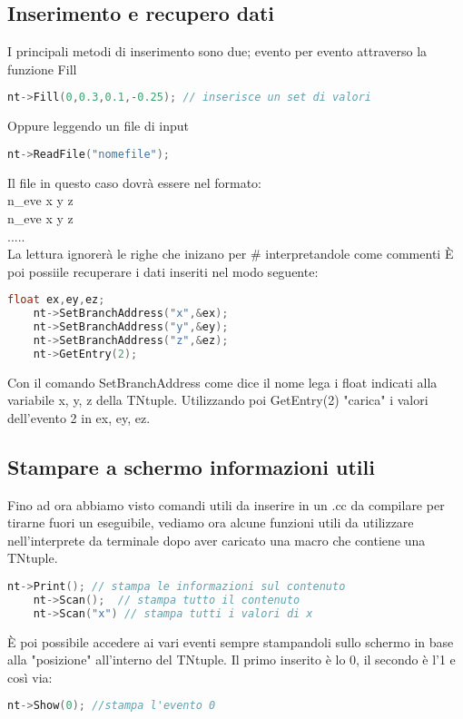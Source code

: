 \subsection{Inserimento e recupero dati}
I principali metodi di inserimento sono due; evento per evento attraverso la funzione Fill
\begin{lstlisting}[language=C++,label={cod1},mathescape=true,breaklines=true]
	nt->Fill(0,0.3,0.1,-0.25); // inserisce un set di valori
\end{lstlisting}
Oppure leggendo un file di input
\begin{lstlisting}[language=C++,label={cod1},mathescape=true,breaklines=true]
	nt->ReadFile("nomefile");
\end{lstlisting}
Il file in questo caso dovrà essere nel formato:\\
n\_eve x y z\\
n\_eve x y z\\
.....\\
La lettura ignorerà le righe che inizano per \# interpretandole come commenti
È poi possiile recuperare i dati inseriti nel modo seguente:
\begin{lstlisting}[language=C++,label={cod1},mathescape=true,breaklines=true]
	float ex,ey,ez;
	nt->SetBranchAddress("x",&ex);
	nt->SetBranchAddress("y",&ey);
	nt->SetBranchAddress("z",&ez);
	nt->GetEntry(2);
\end{lstlisting}
Con il comando SetBranchAddress come dice il nome lega i float indicati alla variabile x, y, z della TNtuple. Utilizzando poi GetEntry(2) "carica" i valori dell'evento 2 in ex, ey, ez. 

\subsection{Stampare a schermo informazioni utili}
Fino ad ora abbiamo visto comandi utili da inserire in un .cc da compilare per tirarne fuori un eseguibile,  vediamo ora alcune funzioni utili da utilizzare nell'interprete da terminale dopo aver caricato una macro che contiene una TNtuple.
\begin{lstlisting}[language=C++,label={cod1},mathescape=true,breaklines=true]
	nt->Print(); // stampa le informazioni sul contenuto
	nt->Scan();  // stampa tutto il contenuto
	nt->Scan("x") // stampa tutti i valori di x
\end{lstlisting}
È poi possibile accedere ai vari eventi sempre stampandoli sullo schermo in base alla "posizione" all'interno del TNtuple. Il primo inserito è lo 0, il secondo è l'1 e così via:
\begin{lstlisting}[language=C++,label={cod1},mathescape=true,breaklines=true]
	nt->Show(0); //stampa l'evento 0
\end{lstlisting}

